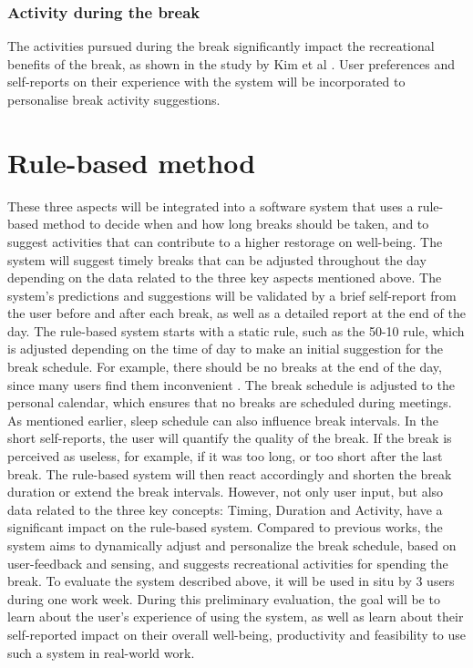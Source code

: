 \documentclass{hasel_thesis}
\begin{document}
\subsubsection{Activity during the break}
The activities pursued during the break significantly impact the recreational benefits of the break, as shown in the study by Kim et al \cite{KimS.ParkY.&Niu.2017}. User preferences and self-reports on their experience with the system will be incorporated to personalise break activity suggestions. 



\section{Rule-based method}
These three aspects will be integrated into a software system that uses a rule-based method to decide when and how long breaks should be taken, and to suggest activities that can contribute to a higher restorage on well-being. The system will suggest timely breaks that can be adjusted throughout the day depending on the data related to the three key aspects mentioned above. The system's predictions and suggestions will be validated by a brief self-report from the user before and after each break, as well as a detailed report at the end of the day.
The rule-based system starts with a static rule, such as the 50-10 rule, which is adjusted depending on the time of day to make an initial suggestion for the break schedule. For example, there should be no breaks at the end of the day, since many users find them inconvenient \cite{KimS.ParkY.&Niu.2017}. The break schedule is adjusted to the personal calendar, which ensures that no breaks are scheduled during meetings. As mentioned earlier, sleep schedule can also influence break intervals. In the short self-reports, the user will quantify the quality of the break. If the break is perceived as useless, for example, if it was too long, or too short after the last break. The rule-based system will then react accordingly and shorten the break duration or extend the break intervals. However, not only user input, but also data related to the three key concepts: Timing, Duration and Activity, have a significant impact on the rule-based system.
Compared to previous works, the system aims to dynamically adjust and personalize the break schedule, based on user-feedback and sensing, and suggests recreational activities for spending the break. 
To evaluate the system described above, it will be used in situ by 3 users during one work week. During this preliminary evaluation, the goal will be to learn about the user’s experience of using the system, as well as learn about their self-reported impact on their overall well-being, productivity and feasibility to use such a system in real-world work.
\end{document}
